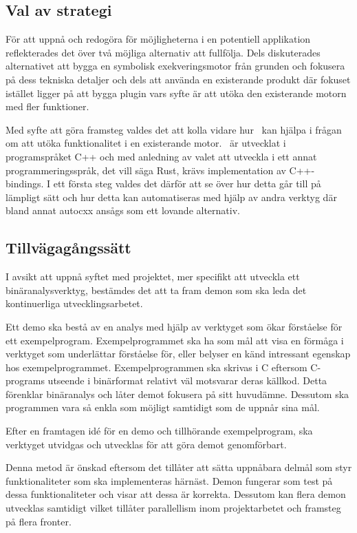 \subsection{Val av strategi}

För att uppnå och redogöra för möjligheterna i en potentiell applikation
reflekterades det över två möjliga alternativ att fullfölja. Dels diskuterades
alternativet att bygga en symbolisk exekveringsmotor från grunden och fokusera
på dess tekniska detaljer och dels att använda en existerande produkt där
fokuset istället ligger på att bygga plugin vars syfte är att utöka den
existerande motorn med fler funktioner.

Med syfte att göra framsteg valdes det att kolla vidare hur \stoe\ kan hjälpa i
frågan om att utöka funktionalitet i en existerande motor. \stoe\ är utvecklat
i programspråket C++ och med anledning av valet att utveckla i ett
annat programmeringsspråk, det vill säga Rust, krävs implementation av
C++-bindings. I ett första steg valdes det därför att se över hur detta går till
på lämpligt sätt och hur detta kan automatiseras med hjälp av andra verktyg
där bland annat autocxx ansågs som ett lovande alternativ.

\subsection{Tillvägagångssätt}
I avsikt att uppnå syftet med projektet, mer specifikt att utveckla ett
binäranalysverktyg, bestämdes det att ta fram demon som ska leda det
kontinuerliga utvecklingsarbetet.

Ett demo ska bestå av en analys med hjälp av verktyget som ökar förståelse för
ett exempelprogram. Exempelprogrammet ska ha som mål att visa en förmåga i
verktyget som underlättar förståelse för, eller belyser en känd intressant
egenskap hos exempelprogrammet. Exempelprogrammen ska skrivas i C eftersom
C-programs utseende i binärformat relativt väl motsvarar deras källkod. Detta
förenklar binäranalys och låter demot fokusera på sitt huvudämne. Dessutom ska
programmen vara så enkla som möjligt samtidigt som de uppnår sina mål.

Efter en framtagen id\'e för en demo och tillhörande exempelprogram, ska
verktyget utvidgas och utvecklas för att göra demot genomförbart.

Denna metod är önskad eftersom det tillåter att sätta uppnåbara delmål som styr
funktionaliteter som ska implementeras härnäst. Demon fungerar som test på dessa
funktionaliteter och visar att dessa är korrekta. Dessutom kan flera demon
utvecklas samtidigt vilket tillåter parallellism inom projektarbetet och
framsteg på flera fronter.

